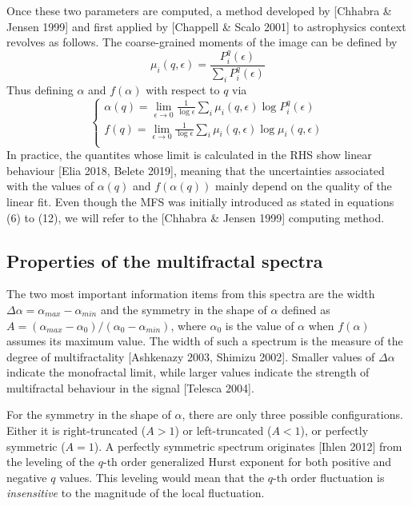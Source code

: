 Once these two parameters are computed, a method developed by [Chhabra \& Jensen 1999] and first applied by [Chappell \& Scalo 2001] to astrophysics context revolves as follows. The coarse-grained moments of the image can be defined by
\begin{equation}
    \mu_i(q,\epsilon)=\frac{P_i^q(\epsilon)}{\sum_iP_i^q(\epsilon)}
\end{equation}
Thus defining $\alpha$ and $f(\alpha)$ with respect to $q$ via
\begin{equation}
    \begin{cases}
\displaystyle    \alpha(q)=\lim_{\epsilon\rightarrow0}\frac{1}{\log\epsilon}\sum_i\mu_i(q,\epsilon)\log P_i^q(\epsilon)\\
    \displaystyle f(q)=\lim_{\epsilon\rightarrow0}\frac{1}{\log\epsilon}\sum_i\mu_i(q,\epsilon)\log \mu_i(q,\epsilon)\\
    \end{cases}
\end{equation}
In practice, the quantites whose limit is calculated in the RHS show linear behaviour [Elia 2018, Belete 2019], meaning that the uncertainties associated with the values of $\alpha(q)$ and $f(\alpha(q))$ mainly depend on the quality of the linear fit. Even though the MFS was initially introduced as stated in equations (6) to (12), we will refer to the [Chhabra \& Jensen 1999] computing method. 

\subsection{Properties of the multifractal spectra}
The two most important information items from this spectra are the width $\Delta\alpha=\alpha_{max}-\alpha_{min}$ and the symmetry in the shape of $\alpha$ defined as $A=(\alpha_{max}-\alpha_0)/(\alpha_0-\alpha_{min})$, where $\alpha_0$ is the value of $\alpha$ when $f(\alpha)$ assumes its maximum value. The width of such a spectrum is the measure of the degree of multifractality [Ashkenazy 2003, Shimizu 2002]. Smaller values of $\Delta\alpha$ indicate the monofractal limit, while larger values indicate the strength of multifractal behaviour in the signal [Telesca 2004].


For the symmetry in the shape of $\alpha$, there are only three possible configurations. 
Either it is right-truncated ($A>1$) or left-truncated ($A<1$), or perfectly symmetric ($A=1$). A perfectly symmetric spectrum originates [Ihlen 2012] from the leveling of the $q$-th order generalized Hurst exponent for both positive and negative $q$ values. This leveling would mean that the $q$-th order fluctuation is \emph{insensitive} to the magnitude of the local fluctuation. 

